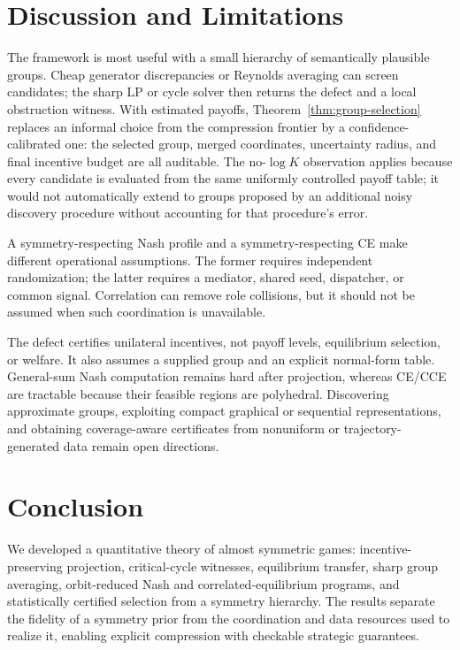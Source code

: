 \section{Discussion and Limitations}

The framework is most useful with a small hierarchy of semantically plausible groups.  Cheap generator discrepancies or Reynolds averaging can screen candidates; the sharp LP or cycle solver then returns the defect and a local obstruction witness.  With estimated payoffs, Theorem~\ref{thm:group-selection} replaces an informal choice from the compression frontier by a confidence-calibrated one: the selected group, merged coordinates, uncertainty radius, and final incentive budget are all auditable.  The no-$\log K$ observation applies because every candidate is evaluated from the same uniformly controlled payoff table; it would not automatically extend to groups proposed by an additional noisy discovery procedure without accounting for that procedure's error.

A symmetry-respecting Nash profile and a symmetry-respecting CE make different operational assumptions.  The former requires independent randomization; the latter requires a mediator, shared seed, dispatcher, or common signal.  Correlation can remove role collisions, but it should not be assumed when such coordination is unavailable.

The defect certifies unilateral incentives, not payoff levels, equilibrium selection, or welfare.  It also assumes a supplied group and an explicit normal-form table.  General-sum Nash computation remains hard after projection, whereas CE/CCE are tractable because their feasible regions are polyhedral.  Discovering approximate groups, exploiting compact graphical or sequential representations, and obtaining coverage-aware certificates from nonuniform or trajectory-generated data remain open directions.

\section{Conclusion}
We developed a quantitative theory of almost symmetric games: incentive-preserving projection, critical-cycle witnesses, equilibrium transfer, sharp group averaging, orbit-reduced Nash and correlated-equilibrium programs, and statistically certified selection from a symmetry hierarchy.  The results separate the fidelity of a symmetry prior from the coordination and data resources used to realize it, enabling explicit compression with checkable strategic guarantees.

